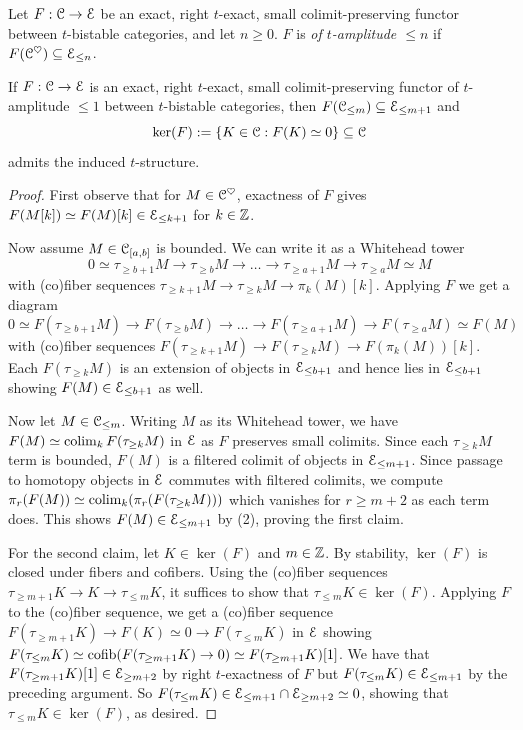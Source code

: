 \begin{definition}\label{def: t-amplitude}
    Let $F:\EuScript{C}\to\EuScript{E}$ be an exact, right $t$-exact, small colimit-preserving functor between $t$-bistable categories, and let $n\geq0$. $F$ is \emph{of $t$-amplitude $\leq n$} if $F(\EuScript{C}^{\heartsuit})\subseteq\EuScript{E}_{\leq n}$. 
\end{definition}
\begin{lemma}\label{lem: homotopy detected kernels of t-amplitude less than 1 functors}
    If $F:\EuScript{C}\to\EuScript{E}$ is an exact, right $t$-exact, small colimit-preserving functor of $t$-amplitude $\leq 1$ between $t$-bistable categories, then $F(\EuScript{C}_{\leq m})\subseteq\EuScript{E}_{\leq m+1}$ and 
    $$\ker(F):=\{K\in\EuScript{C}:F(K)\simeq0\}\subseteq\EuScript{C}$$ 
    admits the induced $t$-structure.  
\end{lemma}
\begin{proof}
    First observe that for $M\in\EuScript{C}^{\heartsuit}$, exactness of $F$ gives $F(M[k])\simeq F(M)[k]\in\EuScript{E}_{\leq k+1}$ for $k\in\mathbb{Z}$. 

    Now assume $M\in\EuScript{C}_{[a,b]}$ is bounded. We can write it as a Whitehead tower 
    $$0\simeq\tau_{\geq b+1}M\to \tau_{\geq b}M\to\dots\to\tau_{\geq a+1}M\to\tau_{\geq a}M\simeq M$$
    with (co)fiber sequences $\tau_{\geq k+1}M\to\tau_{\geq k}M\to \pi_{k}(M)[k]$. Applying $F$ we get a diagram 
    $$0\simeq F(\tau_{\geq b+1}M)\to F(\tau_{\geq b}M)\to\dots\to F(\tau_{\geq a+1}M)\to F(\tau_{\geq a}M)\simeq F(M)$$
    with (co)fiber sequences $F(\tau_{\geq k+1}M)\to F(\tau_{\geq k}M)\to F(\pi_{k}(M))[k]$. Each $F(\tau_{\geq k}M)$ is an extension of objects in $\EuScript{E}_{\leq b+1}$ and hence lies in $\EuScript{E}_{\leq b+1}$ showing $F(M)\in\EuScript{E}_{\leq b+1}$ as well. 

    Now let $M\in\EuScript{C}_{\leq m}$. Writing $M$ as its Whitehead tower, we have $F(M)\simeq\operatorname*{colim}_{k}F(\tau_{\geq k}M)$ in $\EuScript{E}$ as $F$ preserves small colimits. Since each $\tau_{\geq k}M$ term is bounded, $F(M)$ is a filtered colimit of objects in $\EuScript{E}_{\leq m+1}$. Since passage to homotopy objects in $\EuScript{E}$ commutes with filtered colimits, we compute $\pi_{r}(F(M))\simeq\operatorname*{colim}_{k}(\pi_{r}(F(\tau_{\geq k}M)))$ which vanishes for $r\geq m+2$ as each term does. This shows $F(M)\in\EuScript{E}_{\leq m+1}$ by  (2), proving the first claim.

    For the second claim, let $K\in\ker(F)$ and $m\in\mathbb{Z}$. By stability, $\ker(F)$ is closed under fibers and cofibers. Using the (co)fiber sequences $\tau_{\geq m+1}K\to K\to\tau_{\leq m}K$, it suffices to show that $\tau_{\leq m}K\in\ker(F)$. Applying $F$ to the (co)fiber sequence, we get a (co)fiber sequence $F(\tau_{\geq m+1}K)\to F(K)\simeq0\to F(\tau_{\leq m}K)$ in $\EuScript{E}$ showing $F(\tau_{\leq m}K)\simeq\mathrm{cofib}(F(\tau_{\geq m+1}K)\to 0)\simeq F(\tau_{\geq m+1}K)[1]$. We have that $F(\tau_{\geq m+1}K)[1]\in\EuScript{E}_{\geq m+2}$ by right $t$-exactness of $F$ but $F(\tau_{\leq m}K)\in\EuScript{E}_{\leq m+1}$ by the preceding argument. So $F(\tau_{\leq m}K)\in\EuScript{E}_{\leq m+1}\cap\EuScript{E}_{\geq m+2}\simeq0$, showing that $\tau_{\leq m}K\in\ker(F)$, as desired. 
\end{proof}
